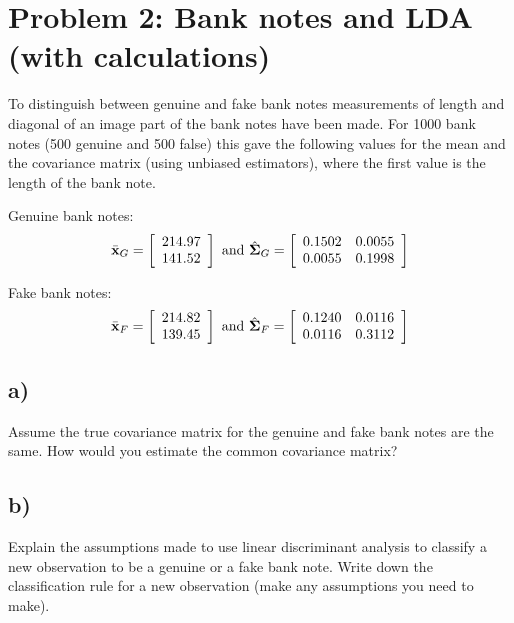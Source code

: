 \documentclass[
]{article}
\begin{document}
\hypertarget{problem-2-bank-notes-and-lda-with-calculations}{%
\section{Problem 2: Bank notes and LDA (with
calculations)}\label{problem-2-bank-notes-and-lda-with-calculations}}

To distinguish between genuine and fake bank notes measurements of
length and diagonal of an image part of the bank notes have been made.
For 1000 bank notes (500 genuine and 500 false) this gave the following
values for the mean and the covariance matrix (using unbiased
estimators), where the first value is the length of the bank note.

Genuine bank notes: \[
\bar{\bf x}_G=\left[     \begin{array}{c} 214.97 \\ 141.52  \end{array} \right]
\text{ and }
\hat{\boldsymbol \Sigma}_G=\left[     \begin{array}{cc} 0.1502 & 0.0055 \\ 0.0055 & 0.1998 
\end{array} \right]
\]

Fake bank notes: \[
\bar{\bf x}_F= \left[     \begin{array}{c} 214.82 \\ 139.45  \end{array} \right]
\text{ and }
\hat{\boldsymbol \Sigma}_F= \left[     \begin{array}{cc} 0.1240 & 0.0116 \\ 0.0116 & 0.3112 
\end{array} \right]
\]

\hypertarget{a-1}{%
\subsection{a)}\label{a-1}}

Assume the true covariance matrix for the genuine and fake bank notes
are the same. How would you estimate the common covariance matrix?

\hypertarget{b-1}{%
\subsection{b)}\label{b-1}}

Explain the assumptions made to use linear discriminant analysis to
classify a new observation to be a genuine or a fake bank note. Write
down the classification rule for a new observation (make any assumptions
you need to make).
\end{document}
